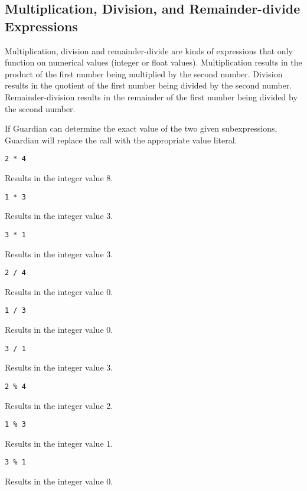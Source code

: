 
\subsection{Multiplication, Division, and Remainder-divide Expressions}
{
	Multiplication, division and remainder-divide are kinds of
	expressions that only function on
	numerical values (integer or float values).
	Multiplication results in the product of the first number being multiplied
	by the second number.
	Division results in the quotient of the first number being divided by the
	second number.
	Remainder-division results in the remainder of the first number being
	divided by the second number.
	
	If Guardian can determine the exact value of the two given subexpressions,
	Guardian will replace the call with the appropriate value literal.
	
	\begin{itemize}
	{
		\item[] \texttt{2 * 4}
		
			Results in the integer value 8.
		
		\item[] \texttt{1 * 3}
		
			Results in the integer value 3.
		
		\item[] \texttt{3 * 1}
		
			Results in the integer value 3.
			
		\item[] \texttt{2 / 4}
		
			Results in the integer value 0.
		
		\item[] \texttt{1 / 3}
		
			Results in the integer value 0.
		
		\item[] \texttt{3 / 1}
		
			Results in the integer value 3.
		
		\item[] \texttt{2 \% 4}
		
			Results in the integer value 2.
		
		\item[] \texttt{1 \% 3}
		
			Results in the integer value 1.
		
		\item[] \texttt{3 \% 1}
		
			Results in the integer value 0.
		
}
\end{itemize}}
